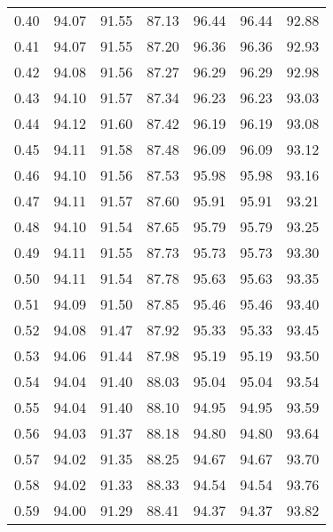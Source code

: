 \begin{tabular}{|c|c|c|c|c|c|c|}
      0.40 &     94.07 &     91.55 &      87.13 &   96.44 &      96.44 &         92.88 \\
      0.41 &     94.07 &     91.55 &      87.20 &   96.36 &      96.36 &         92.93 \\
      0.42 &     94.08 &     91.56 &      87.27 &   96.29 &      96.29 &         92.98 \\
      0.43 &     94.10 &     91.57 &      87.34 &   96.23 &      96.23 &         93.03 \\
      0.44 &     94.12 &     91.60 &      87.42 &   96.19 &      96.19 &         93.08 \\
      0.45 &     94.11 &     91.58 &      87.48 &   96.09 &      96.09 &         93.12 \\
      0.46 &     94.10 &     91.56 &      87.53 &   95.98 &      95.98 &         93.16 \\
      0.47 &     94.11 &     91.57 &      87.60 &   95.91 &      95.91 &         93.21 \\
      0.48 &     94.10 &     91.54 &      87.65 &   95.79 &      95.79 &         93.25 \\
      0.49 &     94.11 &     91.55 &      87.73 &   95.73 &      95.73 &         93.30 \\
      0.50 &     94.11 &     91.54 &      87.78 &   95.63 &      95.63 &         93.35 \\
      0.51 &     94.09 &     91.50 &      87.85 &   95.46 &      95.46 &         93.40 \\
      0.52 &     94.08 &     91.47 &      87.92 &   95.33 &      95.33 &         93.45 \\
      0.53 &     94.06 &     91.44 &      87.98 &   95.19 &      95.19 &         93.50 \\
      0.54 &     94.04 &     91.40 &      88.03 &   95.04 &      95.04 &         93.54 \\
      0.55 &     94.04 &     91.40 &      88.10 &   94.95 &      94.95 &         93.59 \\
      0.56 &     94.03 &     91.37 &      88.18 &   94.80 &      94.80 &         93.64 \\
      0.57 &     94.02 &     91.35 &      88.25 &   94.67 &      94.67 &         93.70 \\
      0.58 &     94.02 &     91.33 &      88.33 &   94.54 &      94.54 &         93.76 \\
      0.59 &     94.00 &     91.29 &      88.41 &   94.37 &      94.37 &         93.82 \\

\end{tabular}
